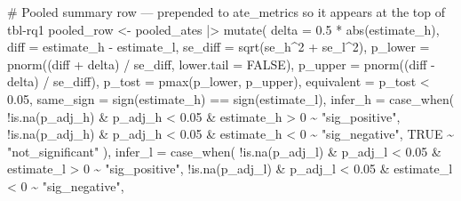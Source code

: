 \documentclass[
  letterpaper,
  DIV=11,
  numbers=noendperiod]{scrartcl}
\newenvironment{Shaded}{\begin{snugshade}}{\end{snugshade}}
\newcommand{\AttributeTok}[1]{\textcolor[rgb]{0.40,0.45,0.13}{#1}}
\newcommand{\CommentTok}[1]{\textcolor[rgb]{0.37,0.37,0.37}{#1}}
\newcommand{\ConstantTok}[1]{\textcolor[rgb]{0.56,0.35,0.01}{#1}}
\newcommand{\DecValTok}[1]{\textcolor[rgb]{0.68,0.00,0.00}{#1}}
\newcommand{\FloatTok}[1]{\textcolor[rgb]{0.68,0.00,0.00}{#1}}
\newcommand{\FunctionTok}[1]{\textcolor[rgb]{0.28,0.35,0.67}{#1}}
\newcommand{\NormalTok}[1]{\textcolor[rgb]{0.00,0.23,0.31}{#1}}
\newcommand{\OtherTok}[1]{\textcolor[rgb]{0.00,0.23,0.31}{#1}}
\newcommand{\SpecialCharTok}[1]{\textcolor[rgb]{0.37,0.37,0.37}{#1}}
\newcommand{\StringTok}[1]{\textcolor[rgb]{0.13,0.47,0.30}{#1}}
\begin{document}
\begin{Shaded}
\begin{Highlighting}[]
\CommentTok{\# Pooled summary row — prepended to ate\_metrics so it appears at the top of tbl{-}rq1}
\NormalTok{pooled\_row }\OtherTok{\textless{}{-}}\NormalTok{ pooled\_ates }\SpecialCharTok{|\textgreater{}}
  \FunctionTok{mutate}\NormalTok{(}
    \AttributeTok{delta      =} \FloatTok{0.5} \SpecialCharTok{*} \FunctionTok{abs}\NormalTok{(estimate\_h),}
    \AttributeTok{diff       =}\NormalTok{ estimate\_h }\SpecialCharTok{{-}}\NormalTok{ estimate\_l,}
    \AttributeTok{se\_diff    =} \FunctionTok{sqrt}\NormalTok{(se\_h}\SpecialCharTok{\^{}}\DecValTok{2} \SpecialCharTok{+}\NormalTok{ se\_l}\SpecialCharTok{\^{}}\DecValTok{2}\NormalTok{),}
    \AttributeTok{p\_lower    =} \FunctionTok{pnorm}\NormalTok{((diff }\SpecialCharTok{+}\NormalTok{ delta) }\SpecialCharTok{/}\NormalTok{ se\_diff, }\AttributeTok{lower.tail =} \ConstantTok{FALSE}\NormalTok{),}
    \AttributeTok{p\_upper    =} \FunctionTok{pnorm}\NormalTok{((diff }\SpecialCharTok{{-}}\NormalTok{ delta) }\SpecialCharTok{/}\NormalTok{ se\_diff),}
    \AttributeTok{p\_tost     =} \FunctionTok{pmax}\NormalTok{(p\_lower, p\_upper),}
    \AttributeTok{equivalent =}\NormalTok{ p\_tost }\SpecialCharTok{\textless{}} \FloatTok{0.05}\NormalTok{,}
    \AttributeTok{same\_sign  =} \FunctionTok{sign}\NormalTok{(estimate\_h) }\SpecialCharTok{==} \FunctionTok{sign}\NormalTok{(estimate\_l),}
    \AttributeTok{infer\_h    =} \FunctionTok{case\_when}\NormalTok{(}
      \SpecialCharTok{!}\FunctionTok{is.na}\NormalTok{(p\_adj\_h) }\SpecialCharTok{\&}\NormalTok{ p\_adj\_h }\SpecialCharTok{\textless{}} \FloatTok{0.05} \SpecialCharTok{\&}\NormalTok{ estimate\_h }\SpecialCharTok{\textgreater{}} \DecValTok{0} \SpecialCharTok{\textasciitilde{}} \StringTok{"sig\_positive"}\NormalTok{,}
      \SpecialCharTok{!}\FunctionTok{is.na}\NormalTok{(p\_adj\_h) }\SpecialCharTok{\&}\NormalTok{ p\_adj\_h }\SpecialCharTok{\textless{}} \FloatTok{0.05} \SpecialCharTok{\&}\NormalTok{ estimate\_h }\SpecialCharTok{\textless{}} \DecValTok{0} \SpecialCharTok{\textasciitilde{}} \StringTok{"sig\_negative"}\NormalTok{,}
      \ConstantTok{TRUE} \SpecialCharTok{\textasciitilde{}} \StringTok{"not\_significant"}
\NormalTok{    ),}
    \AttributeTok{infer\_l    =} \FunctionTok{case\_when}\NormalTok{(}
      \SpecialCharTok{!}\FunctionTok{is.na}\NormalTok{(p\_adj\_l) }\SpecialCharTok{\&}\NormalTok{ p\_adj\_l }\SpecialCharTok{\textless{}} \FloatTok{0.05} \SpecialCharTok{\&}\NormalTok{ estimate\_l }\SpecialCharTok{\textgreater{}} \DecValTok{0} \SpecialCharTok{\textasciitilde{}} \StringTok{"sig\_positive"}\NormalTok{,}
      \SpecialCharTok{!}\FunctionTok{is.na}\NormalTok{(p\_adj\_l) }\SpecialCharTok{\&}\NormalTok{ p\_adj\_l }\SpecialCharTok{\textless{}} \FloatTok{0.05} \SpecialCharTok{\&}\NormalTok{ estimate\_l }\SpecialCharTok{\textless{}} \DecValTok{0} \SpecialCharTok{\textasciitilde{}} \StringTok{"sig\_negative"}\NormalTok{,}

\end{Highlighting}
\end{Shaded}
\end{document}

